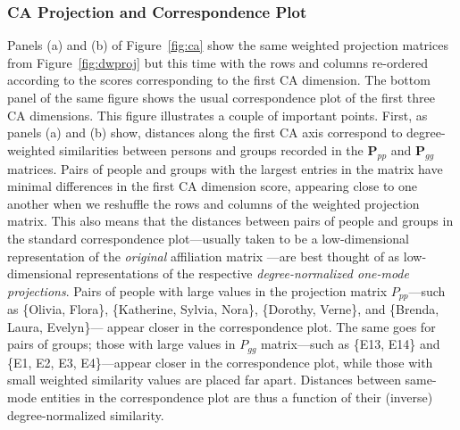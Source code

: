 \documentclass[a4paper,fleqn]{cas-sc}
\begin{document}
\subsubsection{CA Projection and Correspondence Plot} \label{subsec:caplot}
Panels (a) and (b) of Figure~\ref{fig:ca} show the same weighted projection matrices from Figure~\ref{fig:dwproj} but this time with the rows and columns re-ordered according to the scores corresponding to the first CA dimension. The bottom panel of the same figure shows the usual correspondence plot of the first three CA dimensions. This figure illustrates a couple of important points. First, as panels (a) and (b) show, distances along the first CA axis correspond to degree-weighted similarities between persons and groups recorded in the $\mathbf{P}_{pp}$ and $\mathbf{P}_{gg}$ matrices. Pairs of people and groups with the largest entries in the matrix have minimal differences in the first CA dimension score, appearing close to one another when we reshuffle the rows and columns of the weighted projection matrix. This also means that the distances between pairs of people and groups in the standard correspondence plot---usually taken to be a low-dimensional representation of the \textit{original} affiliation matrix \citep{borgatti1997network}---are best thought of as low-dimensional representations of the respective \textit{degree-normalized one-mode projections}. Pairs of people with large values in the projection matrix $P_{pp}$---such as \{Olivia, Flora\},  \{Katherine, Sylvia, Nora\}, \{Dorothy, Verne\}, and \{Brenda, Laura, Evelyn\}--- appear closer in the correspondence plot. The same goes for pairs of groups; those with large values in $P_{gg}$ matrix---such as \{E13, E14\} and \{E1, E2, E3, E4\}---appear closer in the correspondence plot, while those with small weighted similarity values are placed far apart. Distances between same-mode entities in the correspondence plot are thus a function of their (inverse) degree-normalized similarity.
\end{document}
